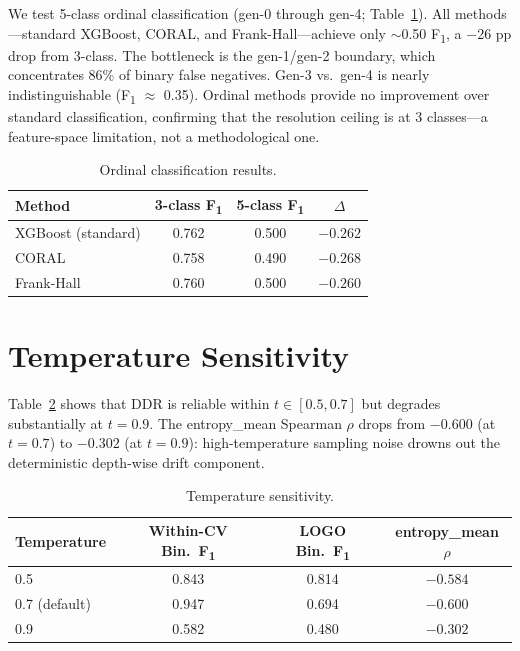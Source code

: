 \documentclass[11pt,a4paper]{article}
\newcommand{\fone}{F\textsubscript{1}}
\newcommand{\rhosp}{\rho}
\begin{document}
We test 5-class ordinal classification (gen-0 through gen-4; Table~\ref{tab:ordinal}).
All methods---standard XGBoost, CORAL, and Frank-Hall---achieve only $\sim$0.50 \fone{}, a $-$26 pp drop from 3-class.
The bottleneck is the gen-1/gen-2 boundary, which concentrates 86\% of binary false negatives.
Gen-3 vs.\ gen-4 is nearly indistinguishable (\fone{} $\approx$ 0.35).
Ordinal methods provide no improvement over standard classification, confirming that the resolution ceiling is at 3 classes---a feature-space limitation, not a methodological one.

\begin{table}[h]
\centering
\caption{Ordinal classification results.}
\label{tab:ordinal}
\begin{tabular}{lccc}
\toprule
\textbf{Method} & \textbf{3-class \fone{}} & \textbf{5-class \fone{}} & $\Delta$ \\
\midrule
XGBoost (standard) & 0.762 & 0.500 & $-0.262$ \\
CORAL & 0.758 & 0.490 & $-0.268$ \\
Frank-Hall & 0.760 & 0.500 & $-0.260$ \\
\bottomrule
\end{tabular}
\end{table}

\section{Temperature Sensitivity}
\label{app:temp}

Table~\ref{tab:temp} shows that DDR is reliable within $t \in [0.5, 0.7]$ but degrades substantially at $t = 0.9$.
The entropy\_mean Spearman $\rhosp$ drops from $-0.600$ (at $t = 0.7$) to $-0.302$ (at $t = 0.9$):
high-temperature sampling noise drowns out the deterministic depth-wise drift component.

\begin{table}[h]
\centering
\caption{Temperature sensitivity.}
\label{tab:temp}
\begin{tabular}{lccc}
\toprule
\textbf{Temperature} & \textbf{Within-CV Bin.\ \fone{}} & \textbf{LOGO Bin.\ \fone{}} & \textbf{entropy\_mean $\rhosp$} \\
\midrule
0.5 & 0.843 & 0.814 & $-0.584$ \\
0.7 (default) & 0.947 & 0.694 & $-0.600$ \\
0.9 & 0.582 & 0.480 & $-0.302$ \\
\bottomrule
\end{tabular}
\end{table}
\end{document}
